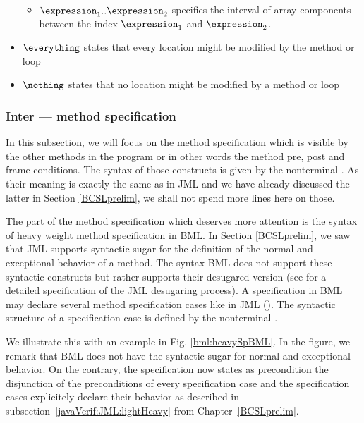 \begin{itemize}
\begin{itemize}
                  \item $ \expression_1 .. \expression_2$ specifies the interval of array components between the index $\expression_1$  and $\expression_2$.  
                         
            \end{itemize}

      \item $\everything $ states that every location might be modified by the method or loop
      \item $\nothing$ states that no location might be modified by a method or loop
\end{itemize}


\subsubsection{Inter --- method specification}

 In this subsection, we will focus on the method specification which is visible by the other methods in the program
 or in other words the method pre, post and frame conditions. 
 The syntax of those constructs is given by the nonterminal
 \MethodSpec. As their meaning is exactly the same as in JML and we have already discussed the latter
  in Section \ref{BCSLprelim}, we shall not spend more lines here on those.

 The part of the method specification which deserves more attention 
 is the syntax of heavy weight method specification in BML. 
 In Section \ref{BCSLprelim}, we saw that JML supports syntactic sugar for
 the definition of the normal and exceptional behavior of a method. 
 The syntax BML does not
 support these syntactic constructs but rather supports their desugared version
 (see \cite{RT03djml} for a detailed specification of the JML desugaring process).
 A specification in BML may declare several method specification cases like in JML (\specCases).
 The syntactic structure of a specification case is defined by the nonterminal \specCase.



 We illustrate this with an example in Fig. \ref{bml:heavySpBML}.
 In the figure, we remark that BML does not have the syntactic sugar for normal and exceptional behavior.
 On the contrary, the specification now states 
as precondition the disjunction of the preconditions of every specification case and 
the specification cases explicitely declare their behavior as described in subsection~\ref{javaVerif:JML:lightHeavy} from Chapter~\ref{BCSLprelim}.

